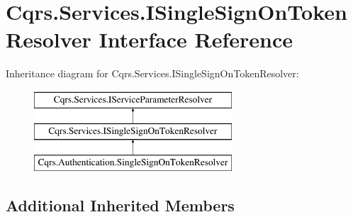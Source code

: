 \hypertarget{interfaceCqrs_1_1Services_1_1ISingleSignOnTokenResolver}{}\section{Cqrs.\+Services.\+I\+Single\+Sign\+On\+Token\+Resolver Interface Reference}
\label{interfaceCqrs_1_1Services_1_1ISingleSignOnTokenResolver}
Inheritance diagram for Cqrs.\+Services.\+I\+Single\+Sign\+On\+Token\+Resolver\+:\begin{figure}[H]
\begin{center}
\leavevmode
\includegraphics[height=3.000000cm]{interfaceCqrs_1_1Services_1_1ISingleSignOnTokenResolver}
\end{center}
\end{figure}
\subsection*{Additional Inherited Members}

